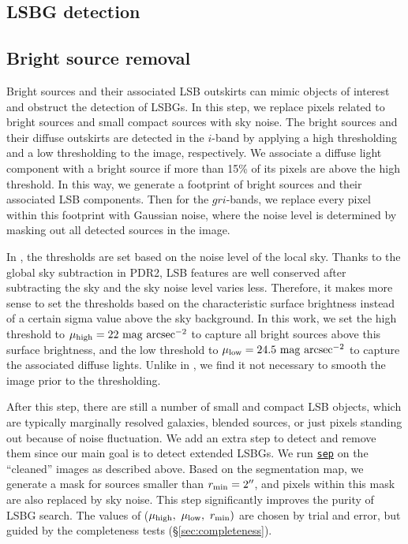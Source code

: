 \documentclass[twocolumn,astrosymb,twocolappendix]{aastex631}
\newcommand{\sbunit}{\mathrm{mag\ arcsec}^{-2}}
\newcommand{\code}[1]{\texttt{#1}}
\begin{document}
\begin{CJK*}{UTF8}{gbsn}
{}




\newpage
\appendix 


\section{LSBG detection}\label{ap:detection}
\subsection{Bright source removal}
Bright sources and their associated LSB outskirts can mimic objects of interest and obstruct the detection of LSBGs. In this step, we replace pixels related to bright sources and small compact sources with sky noise. The bright sources and their diffuse outskirts are detected in the $i$-band by applying a high thresholding and a low thresholding to the image, respectively. We associate a diffuse light component with a bright source if more than 15\% of its pixels are above the high threshold. In this way, we generate a footprint of bright sources and their associated LSB components. Then for the $gri$-bands, we replace every pixel within this footprint with Gaussian noise, where the noise level is determined by masking out all detected sources in the image. 
    
In , the thresholds are set based on the noise level of the local sky. Thanks to the global sky subtraction in PDR2, LSB features are well conserved after subtracting the sky and the sky noise level varies less. Therefore, it makes more sense to set the thresholds based on the characteristic surface brightness instead of a certain sigma value above the sky background. In this work, we set the high threshold to $\mu_{\rm high} = 22\ \sbunit$ to capture all bright sources above this surface brightness, and the low threshold to $\mu_{\rm low} = 24.5\ \sbunit$ to capture the associated diffuse lights. Unlike in , we find it not necessary to smooth the image prior to the thresholding. 

After this step, there are still a number of small and compact LSB objects, which are typically marginally resolved galaxies, blended sources, or just pixels standing out because of noise fluctuation. We add an extra step to detect and remove them since our main goal is to detect extended LSBGs. We run \href{https://sep.readthedocs.io/en/v1.1.x}{\code{sep}} \citep{Barbary2016} on the ``cleaned'' images as described above. Based on the segmentation map, we generate a mask for sources smaller than $r_{\rm min} = 2\mbox{$^{\prime\prime}$}$, and pixels within this mask are also replaced by sky noise. This step significantly improves the purity of LSBG search. The values of ($\mu_{\rm high},\ \mu_{\rm low},\ r_{\rm min})$ are chosen by trial and error, but guided by the completeness tests (\S \ref{sec:completeness}). 
    

\end{CJK*}
\end{document}
